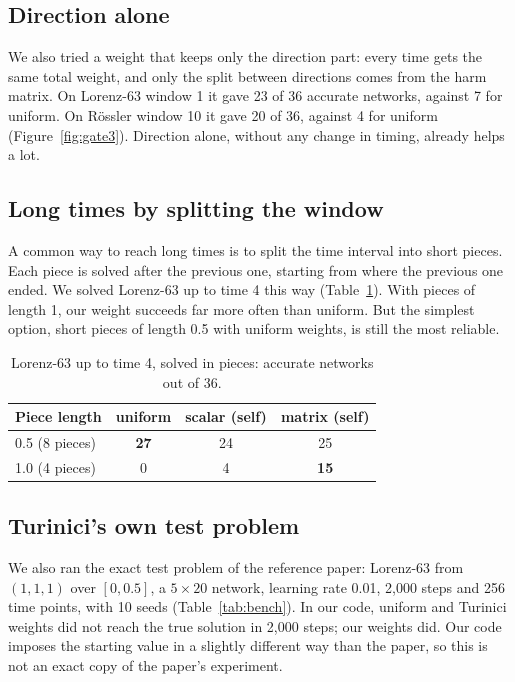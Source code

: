 \documentclass[11pt,a4paper]{article}
\begin{document}
\subsection{Direction alone}
We also tried a weight that keeps only the direction part: every time gets the same total
weight, and only the split between directions comes from the harm matrix. On Lorenz-63
window 1 it gave 23 of 36 accurate networks, against 7 for uniform. On Rössler window 10
it gave 20 of 36, against 4 for uniform (Figure~\ref{fig:gate3}). Direction alone,
without any change in timing, already helps a lot.

\subsection{Long times by splitting the window}
A common way to reach long times is to split the time interval into short pieces. Each
piece is solved after the previous one, starting from where the previous one ended. We
solved Lorenz-63 up to time 4 this way (Table~\ref{tab:march}). With pieces of length 1,
our weight succeeds far more often than uniform. But the simplest option, short pieces of
length 0.5 with uniform weights, is still the most reliable.

\begin{table}[H]\centering
\caption{Lorenz-63 up to time 4, solved in pieces: accurate networks out of 36.}
\label{tab:march}
\begin{tabular}{lccc}\toprule
Piece length & uniform & scalar (self) & matrix (self)\\\midrule
0.5 (8 pieces) & \textbf{27} & 24 & 25\\
1.0 (4 pieces) & 0 & 4 & \textbf{15}\\\bottomrule
\end{tabular}
\end{table}

\subsection{Turinici's own test problem}
We also ran the exact test problem of the reference paper: Lorenz-63 from $(1,1,1)$ over
$[0,0.5]$, a $5\times20$ network, learning rate 0.01, 2{,}000 steps and 256 time points,
with 10 seeds (Table~\ref{tab:bench}). In our code, uniform and Turinici weights did not
reach the true solution in 2{,}000 steps; our weights did. Our code imposes the starting
value in a slightly different way than the paper, so this is not an exact copy of the
paper's experiment.
\end{document}
